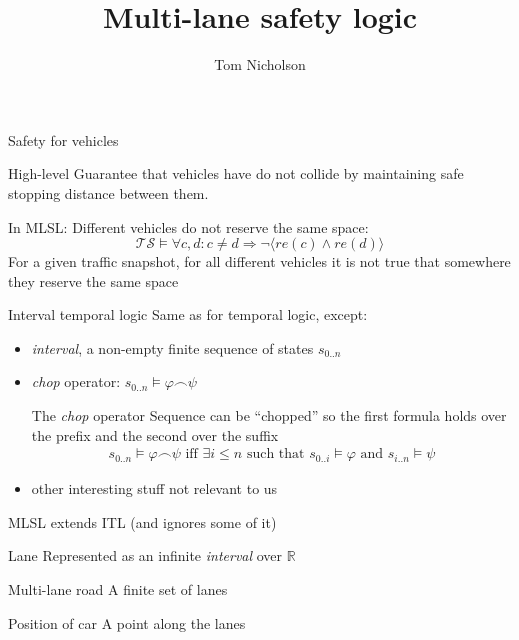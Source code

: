 \documentclass[xcolor=table]{beamer}
\title[Coordinated Autonomous Vehicle Safety]{Multi-lane safety logic}
\author{Tom Nicholson}
\institute{Seoul National University}
\begin{document}
		
	\frame{\titlepage}
	
\begin{frame}{Safety for vehicles}
\begin{block}{High-level}
	Guarantee that vehicles have do not collide by maintaining safe stopping distance between them.
\end{block}
\pause

\begin{block}{In MLSL:}
	Different vehicles do not reserve the same space:
	\pause
	\begin{equation*}
	\mathcal{TS} \models \forall c, d: c \ne d \Rightarrow \neg \langle re(c) \land re(d)\rangle
	\end{equation*}
	For a given traffic snapshot, for all different vehicles it is not true that somewhere they reserve the same space
\end{block}

\end{frame}



\begin{frame}{Interval temporal logic}
Same as for temporal logic, except:

\begin{itemize}
	\item \textit{interval}, a non-empty finite sequence of states $s_{0..n}$
	\pause
	\item \textit{chop} operator: $s_{0..n} \models \varphi \frown \psi$
	\begin{block}{The \textit{chop} operator}
		Sequence can be ``chopped'' so the first formula holds over the prefix and the second over the suffix
		\begin{gather*}
		s_{0..n} \models \varphi \frown \psi \text{  iff  } \exists i \le n \text{   such that    } s_{0..i} \models \varphi \text{ and } s_{i..n} \models \psi
		\end{gather*}
		
	\end{block}
	\pause
	\item other interesting stuff not relevant to us
\end{itemize}

\end{frame}  

\begin{frame}{MLSL extends ITL (and ignores some of it)}

\begin{block}{Lane}
	Represented as an infinite \textit{interval} over $\mathbb{R}$
\end{block}
\pause
\begin{block}{Multi-lane road}
	A finite set of lanes
\end{block}
\pause
\begin{block}{Position of car}
	A point along the lanes
\end{block}


\end{frame}
\end{document}
